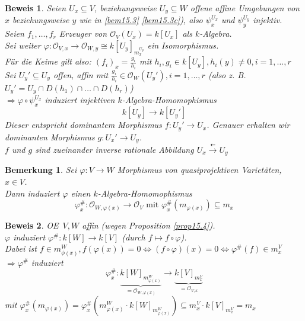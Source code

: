 \documentclass[a4paper,12pt]{report}
\theoremstyle{break}
\newtheorem{Bem}[Def]{Bemerkung}
\theoremstyle{nonumberbreak}
\newtheorem{Bew}{Beweis}
\theoremstyle{nonumberplain}
\newcommand{\calO}{\mathcal{O}}
\renewcommand{\OE}{O\!\!E~}
\begin{document}
\begin{Bew}
Seien $U_x\subseteq V$, beziehungsweise $U_y\subseteq W$ offene affine Umgebungen von $x$ beziehungsweise $y$ wie in \ref{bem15.3} \ref{bem15.3c}), also $\psi_x^{U_x}$ und $\psi_y^{U_y}$ injektiv. Seien $f_1,\ldots ,f_r$ Erzeuger von $\calO_V(U_x)=k[U_x]$ als $k$-Algebra.\\
Sei weiter $\varphi:\calO_{V,x}\to\calO_{W,y}\cong k[U_y]_{m_x^{U_y}}$ ein Isomorphismus.\\
F\"ur die Keime gilt also: $(f_i)_x=\frac{g_i}{h_i}$ mit $h_i, g_i \in k[U_y], h_i(y)\ne 0, i=1,\ldots ,r$\\
Sei $U_y' \subseteq U_y$ offen, affin mit $\frac{g_i}{h_i}\in\calO_W(U_y'), i=1,\ldots ,r$ (also z. B. $U_y'=U_y\cap D(h_1)\cap\ldots \cap D(h_r)$)\\
$\Rightarrow \varphi\circ\psi_x^{U_x}$ induziert injektiven $k$-Algebra-Homomophismus
	\[k[U_y]\to k[U_y']\]
Dieser entspricht dominantem Morphismus $f:U_y'\to U_x$. Genauer erhalten wir dominanten Morphismus $g:U_x'\to U_y$.\\
$f$ und $g$ sind zueinander inverse rationale Abbildung $U_x \overset{\dashleftarrow}{\to} U_y$ %
\end{Bew}

\begin{Bem}
Sei $\varphi: V\to W$ Morphismus von quasiprojektiven Variet\"aten, $x\in V$.\\
Dann induziert $\varphi$ einen $k$-Algebra-Homomophismus
	\[\varphi_x^{\#}:\calO_{W,\varphi(x)}\to\calO_V \text{ mit } \varphi_x^{\#}(m_{\varphi(x)})\subseteq m_x\]
\end{Bem}

\begin{Bew}
\OE $V,W$ affin (wegen Proposition \ref{prop15.4}).\\
$\varphi$ induziert $\varphi^\#:k[W]\to k[V]$ (durch $f\mapsto f\circ\varphi$).\\
Dabei ist $f\in m_{\phi(x)}^W, f(\varphi(x))=0 \Leftrightarrow (f\circ\varphi)(x)=0 \Leftrightarrow \varphi^\#(f)\in m_x^V$\\
$\Rightarrow \varphi^\#$ induziert
	\[ \varphi_x^\#: \underbrace{k[W]_{m_{\varphi(x)}^W}}_{=\calO_{W,\varphi(x)}} \to \underbrace{k[V]_{m_x^V}}_{=\calO_{V,x}}\]
mit $\varphi_x^\#(m_{\varphi(x)}) = \varphi_x^\#(m_{\varphi(x)}^W \cdot k[W]_{m_{\varphi(x)}^W}) \subseteq m_x^V \cdot k[V]_{m_x^V} = m_x$
\end{Bew}
\end{document}

